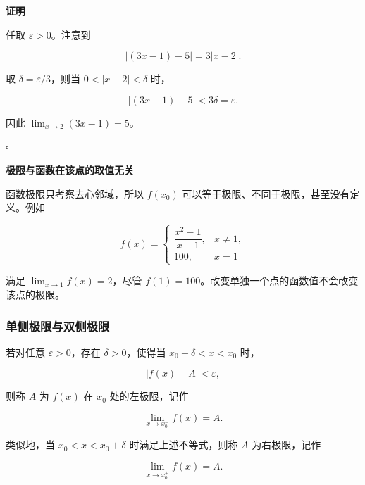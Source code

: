\documentclass[fontset=fandol]{ctexart}
\newenvironment{custom}[1]{\par\noindent\textbf{#1}\quad}{\par\vspace{0.8em}}
\newenvironment{proofdetail}{\par\noindent\textbf{证明}\quad}{\hfill$\square$\par\vspace{0.8em}}
\begin{document}
\begin{proofdetail}

任取 \(\varepsilon>0\)。注意到

\[

|(3x-1)-5|=3|x-2|.

\]

取 \(\delta=\varepsilon/3\)，则当 \(0<|x-2|<\delta\) 时，

\[

|(3x-1)-5|<3\delta=\varepsilon.

\]

因此 \(\lim_{x\to2}(3x-1)=5\)。

\end{proofdetail}



\begin{custom}{极限与函数在该点的取值无关}

函数极限只考察去心邻域，所以 \(f(x_0)\) 可以等于极限、不同于极限，甚至没有定义。例如

\[

f(x)=

\begin{cases}

\dfrac{x^2-1}{x-1},&x\neq1,\\

100,&x=1

\end{cases}

\]

满足 \(\lim_{x\to1}f(x)=2\)，尽管 \(f(1)=100\)。改变单独一个点的函数值不会改变该点的极限。

\end{custom}



\subsubsection*{单侧极限与双侧极限}



\begin{definition}[左极限与右极限]

若对任意 \(\varepsilon>0\)，存在 \(\delta>0\)，使得当 \(x_0-\delta<x<x_0\) 时，

\[

|f(x)-A|<\varepsilon,

\]

则称 \(A\) 为 \(f(x)\) 在 \(x_0\) 处的左极限，记作

\[

\lim_{x\to x_0^-}f(x)=A.

\]

类似地，当 \(x_0<x<x_0+\delta\) 时满足上述不等式，则称 \(A\) 为右极限，记作

\[

\lim_{x\to x_0^+}f(x)=A.

\]

\end{definition}
\end{document}

